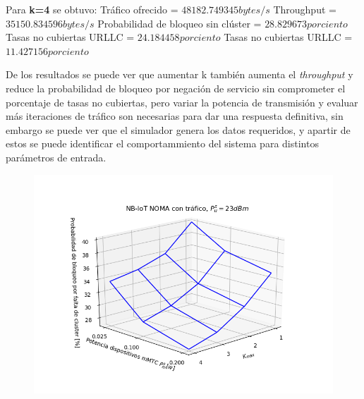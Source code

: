 Para \textbf{k=4} se obtuvo:\newline
Tráfico ofrecido = $48182.749345 bytes/s$ \newline
Throughput = $35150.834596 bytes/s$ \newline
Probabilidad de bloqueo sin clúster = $28.829673 porciento$ \newline
Tasas no cubiertas URLLC = $24.184458 porciento$ \newline
Tasas no cubiertas URLLC = $11.427156 porciento$ \newline

De los resultados se puede ver que aumentar k también aumenta el \textit{throughput} y reduce la probabilidad de bloqueo por negación de servicio sin comprometer el porcentaje de tasas no cubiertas, pero variar la potencia de transmisión y evaluar más iteraciones de tráfico son necesarias para dar una respuesta definitiva, sin embargo se puede ver que el simulador genera los datos requeridos, y apartir de estos se puede identificar el comportammiento del sistema para distintos parámetros de entrada.

\begin{figure}[th]
    \centering
    \includegraphics[scale=1]{Figures/ResultadosTrafico/Figure_1.png}
    \decoRule
    \caption[]{}
    \label{fig:}
\end{figure}

